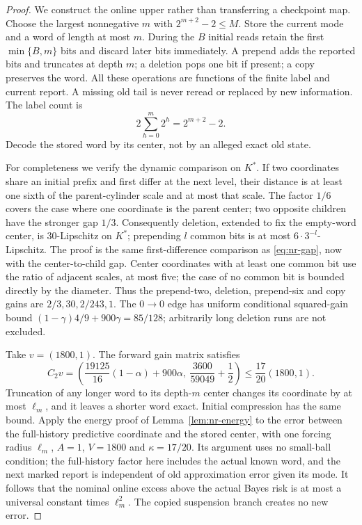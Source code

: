\begin{proof}
We construct the online upper rather than transferring a checkpoint map. Choose the largest nonnegative $m$ with $2^{m+2}-2\le M$. Store the current mode and a word of length at most $m$. During the $B$ initial reads retain the first $\min\{B,m\}$ bits and discard later bits immediately. A prepend adds the reported bits and truncates at depth $m$; a deletion pops one bit if present; a copy preserves the word. All these operations are functions of the finite label and current report. A missing old tail is never reread or replaced by new information. The label count is
\[
 2\sum_{h=0}^m2^h=2^{m+2}-2.
\]
Decode the stored word by its center, not by an alleged exact old state.

For completeness we verify the dynamic comparison on $K^*$. If two coordinates share an initial prefix and first differ at the next level, their distance is at least one sixth of the parent-cylinder scale and at most that scale. The factor $1/6$ covers the case where one coordinate is the parent center; two opposite children have the stronger gap $1/3$. Consequently deletion, extended to fix the empty-word center, is $30$-Lipschitz on $K^*$; prepending $l$ common bits is at most $6\cdot3^{-l}$-Lipschitz. The proof is the same first-difference comparison as \eqref{eq:nr-gap}, now with the center-to-child gap. Center coordinates with at least one common bit use the ratio of adjacent scales, at most five; the case of no common bit is bounded directly by the diameter. Thus the prepend-two, deletion, prepend-six and copy gains are $2/3,30,2/243,1$. The $0\to0$ edge has uniform conditional squared-gain bound $(1-\gamma)4/9+900\gamma=85/128$; arbitrarily long deletion runs are not excluded.

Take $v=(1800,1)$. The forward gain matrix satisfies
\[
 C_2v=\left(\frac{19125}{16}(1-\alpha)+900\alpha,\ \frac{3600}{59049}+\frac12\right)
                  \le\frac{17}{20}(1800,1).
\]
Truncation of any longer word to its depth-$m$ center changes its coordinate by at most $\ell_m$, and it leaves a shorter word exact. Initial compression has the same bound. Apply the energy proof of Lemma~\ref{lem:nr-energy} to the error between the full-history predictive coordinate and the stored center, with one forcing radius $\ell_m$, $A=1$, $V=1800$ and $\kappa=17/20$. Its argument uses no small-ball condition; the full-history factor here includes the actual known word, and the next marked report is independent of old approximation error given its mode. It follows that the nominal online excess above the actual Bayes risk is at most a universal constant times $\ell_m^2$. The copied suspension branch creates no new error.


\end{proof}
